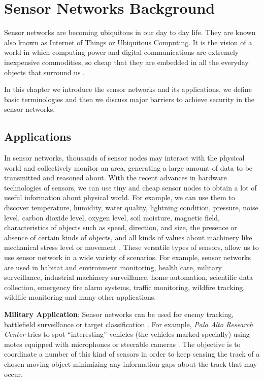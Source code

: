 \chapter{Sensor Networks Background} 
\label{cha:Sensor Networks/Data Aggregation/Security Background}
	
	Sensor networks are becoming ubiquitous in our day to day life. 
	They are known also known as Internet of Things or Ubiquitous Computing.
	It is the vision of a world in which computing power and digital communications are extremely inexpensive commodities, so cheap that they are embedded in all the everyday objects that surround us \cite{2002-Stajano-ubiquitous}.
	
	In this chapter we introduce the sensor networks and its applications, we define basic terminologies and then we discuss major 
	barriers to achieve security in the sensor networks.

\section{Applications}
	In sensor networks, thousands of sensor nodes may interact with the physical world and collectively monitor an area, generating a large amount of data to be transmitted and reasoned about.
	With the recent advances in hardware technologies of sensors, we can use tiny and cheap sensor nodes to obtain a lot of useful information about physical world.
	For example, we can use them to discover temperature, humidity, water quality, lightning condition, pressure, noise level, carbon dioxide level, oxygen level, soil moisture, magnetic field, characteristics of objects such as speed, direction, and size, the presence or absence of certain kinds of objects, and all kinds of values about machinery like mechanical stress level or movement \cite{hof2007applications}.
	These versatile types of sensors, allow us to use sensor network in a wide variety of scenarios.
	For example, sensor networks are used in habitat and environment monitoring, health care, military surveillance, industrial machinery surveillance, home automation, scientific data collection, emergency fire alarm systems, traffic monitoring, wildfire tracking, wildlife monitoring and many other applications.
	
	\textbf{Military Application}: 
		Sensor networks can be used for enemy tracking, battlefield surveillance or target classification \cite{li2002detection}.
		For example, \textit{Palo Alto Research Center} tries to spot ``interesting'' vehicles (the vehicles marked specially) using motes equipped with microphones or steerable cameras \cite{chu2004distributed}.
		The objective is to coordinate a number of this kind of sensors in order to keep sensing the track of a chosen moving object minimizing any information gaps about the track that may occur.
	
